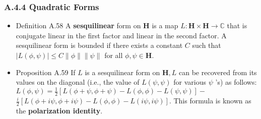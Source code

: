 \subsubsection{A.4.4 Quadratic Forms}

\begin{itemize}
\item Definition A.58 A \textbf{sesquilinear} form on $\mathbf{H}$ is a map $L: \mathbf{H} \times \mathbf{H} \rightarrow \mathbb{C}$ that is conjugate linear in the first factor and linear in the second factor. A sesquilinear form is bounded if there exists a constant $C$ such that $|L(\phi, \psi)| \leq C\|\phi\|\|\psi\|$ for all $\phi, \psi \in \mathbf{H}$.

\item Proposition A.59 If $L$ is a sesquilinear form on $\mathbf{H}, L$ can be recovered from its values on the diagonal (i.e., the value of $L(\psi, \psi)$ for various $\psi$ 's) as follows: $L(\phi, \psi) =\frac{1}{2}[L(\phi+\psi, \phi+\psi)-L(\phi, \phi)-L(\psi, \psi)]
-$ $\frac{i}{2}[L(\phi+i \psi, \phi+i \psi)-L(\phi, \phi)-L(i \psi, i \psi)]$. This formula is known as the \textbf{polarization identity}.
\end{itemize}

